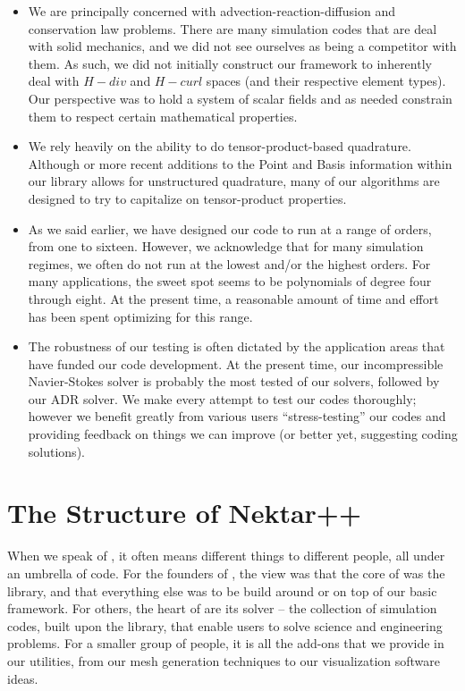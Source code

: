\begin{itemize}
\item We are principally concerned with advection-reaction-diffusion and conservation law problems.   There are many
simulation codes that are deal with solid mechanics, and we did not see ourselves as being a competitor with them.  As such,
we did not initially construct our framework to inherently deal with $H-div$ and $H-curl$ spaces (and their respective element types).
Our perspective was to hold a system of scalar fields and as needed constrain them to respect certain mathematical properties.  

\item We rely heavily on the ability to do tensor-product-based quadrature.  Although or more recent additions to the Point and Basis
information within our library allows for unstructured quadrature, many of our algorithms are designed to try to capitalize on
tensor-product properties.

\item As we said earlier, we have designed our code to run at a range of orders, from one to sixteen.  However, we acknowledge that 
for many simulation regimes, we often do not run at the lowest and/or the highest orders.  For many applications, the sweet spot seems
to be polynomials of degree four through eight.  At the present time, a reasonable amount of time and effort has been spent optimizing
for this range.

\item The robustness of our testing is often dictated by the application areas that have funded our code development.  At the present
time, our incompressible Navier-Stokes solver is probably the most tested of our solvers, followed by our ADR solver.  We make
every attempt to test our codes thoroughly; however we benefit greatly from various users ``stress-testing'' our codes and providing 
feedback on things we can improve (or better yet, suggesting coding solutions).
\end{itemize}



\section{The Structure of Nektar++}

When we speak of {\nek}, it often means different things to different people, all under an umbrella of code.  For the founders of {\nek}, 
the view was that the core of {\nek} was the library, and that everything else was to be build around or on top of our basic \shp framework.
For others, the heart of {\nek} are its solver -- the collection of simulation codes, built upon the library, that enable users to solve
science and engineering problems.   For a smaller group of people, it is all the add-ons that we provide in our utilities, from our
mesh generation techniques to our visualization software ideas.   

